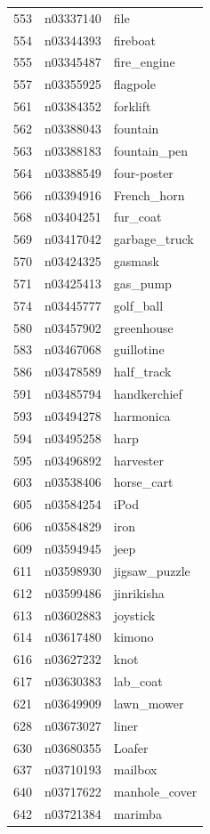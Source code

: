 \begin{table}
\begin{tabular}{cll}
553 & n03337140 & file \\
554 & n03344393 & fireboat \\
555 & n03345487 & fire_engine \\
557 & n03355925 & flagpole \\
561 & n03384352 & forklift \\
562 & n03388043 & fountain \\
563 & n03388183 & fountain_pen \\
564 & n03388549 & four-poster \\
566 & n03394916 & French_horn \\
568 & n03404251 & fur_coat \\
569 & n03417042 & garbage_truck \\
570 & n03424325 & gasmask \\
571 & n03425413 & gas_pump \\
574 & n03445777 & golf_ball \\
580 & n03457902 & greenhouse \\
583 & n03467068 & guillotine \\
586 & n03478589 & half_track \\
591 & n03485794 & handkerchief \\
593 & n03494278 & harmonica \\
594 & n03495258 & harp \\
595 & n03496892 & harvester \\
603 & n03538406 & horse_cart \\
605 & n03584254 & iPod \\
606 & n03584829 & iron \\
609 & n03594945 & jeep \\
611 & n03598930 & jigsaw_puzzle \\
612 & n03599486 & jinrikisha \\
613 & n03602883 & joystick \\
614 & n03617480 & kimono \\
616 & n03627232 & knot \\
617 & n03630383 & lab_coat \\
621 & n03649909 & lawn_mower \\
628 & n03673027 & liner \\
630 & n03680355 & Loafer \\
637 & n03710193 & mailbox \\
640 & n03717622 & manhole_cover \\
642 & n03721384 & marimba \\

\end{tabular}
\end{table}
